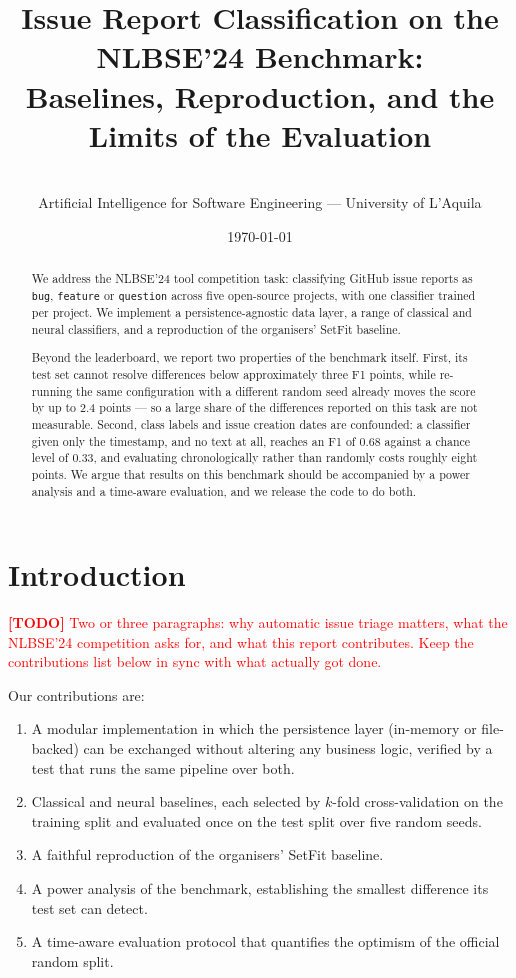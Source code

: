 \documentclass[10pt,a4paper]{article}
\title{Issue Report Classification on the NLBSE'24 Benchmark:\\
       Baselines, Reproduction, and the Limits of the Evaluation}
\author{%
  \todoitem{names and matriculation numbers} \\
  \small Artificial Intelligence for Software Engineering ---
  University of L'Aquila
}
\date{\today}
\newcommand{\todoitem}[1]{\textcolor{red}{\textbf{[TODO]} #1}}
\begin{document}
\maketitle

\begin{abstract}
We address the NLBSE'24 tool competition task: classifying GitHub issue
reports as \texttt{bug}, \texttt{feature} or \texttt{question} across five
open-source projects, with one classifier trained per project. We implement a
persistence-agnostic data layer, a range of classical and neural classifiers,
and a reproduction of the organisers' SetFit baseline.

Beyond the leaderboard, we report two properties of the benchmark itself.
First, its test set cannot resolve differences below approximately three F1
points, while re-running the same configuration with a different random seed
already moves the score by up to 2.4 points --- so a large share of the
differences reported on this task are not measurable. Second, class labels and
issue creation dates are confounded: a classifier given only the timestamp,
and no text at all, reaches an F1 of 0.68 against a chance level of 0.33, and
evaluating chronologically rather than randomly costs roughly eight points. We
argue that results on this benchmark should be accompanied by a power analysis
and a time-aware evaluation, and we release the code to do both.
\end{abstract}

\section{Introduction}
\label{sec:intro}

\todoitem{Two or three paragraphs: why automatic issue triage matters, what
the NLBSE'24 competition asks for, and what this report contributes. Keep the
contributions list below in sync with what actually got done.}

Our contributions are:
\begin{enumerate}
  \item A modular implementation in which the persistence layer (in-memory or
        file-backed) can be exchanged without altering any business logic,
        verified by a test that runs the same pipeline over both.
  \item Classical and neural baselines, each selected by $k$-fold
        cross-validation on the training split and evaluated once on the test
        split over five random seeds.
  \item A faithful reproduction of the organisers' SetFit baseline.
  \item A power analysis of the benchmark, establishing the smallest
        difference its test set can detect.
  \item A time-aware evaluation protocol that quantifies the optimism of the
        official random split.
\end{enumerate}
\end{document}
